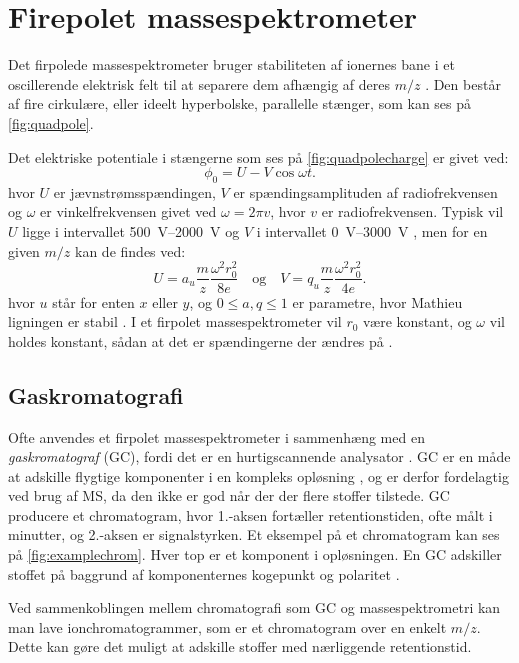 \section{Firepolet massespektrometer}
Det firpolede massespektrometer bruger stabiliteten af ionernes bane i et oscillerende elektrisk felt til at separere dem afhængig af deres $m/z$ \parencite{massspec}.
Den består af fire cirkulære, eller ideelt hyperbolske, parallelle stænger, som kan ses på \cref{fig:quadpole}.

Det elektriske potentiale i stængerne som ses på \cref{fig:quadpolecharge} er givet ved:
\begin{equation}
	\phi_0 = U - V \cos{\omega t}.
\end{equation}
hvor $U$ er jævnstrømsspændingen, $V$ er spændingsamplituden af radiofrekvensen og $\omega$ er vinkelfrekvensen givet ved $\omega = 2\pi v$, hvor $v$ er radiofrekvensen.
Typisk vil $U$ ligge i intervallet \qtyrange{500}{2000}{\volt} og $V$ i intervallet \qtyrange{0}{3000}{\volt} \parencite{massspec}, men for en given $m/z$ kan de findes ved:
\begin{equation}
	U = a_u \frac{m}{z} \frac{\omega^2 r_0^2}{8e}\quad\text{og}\quad V = q_u \frac{m}{z} \frac{\omega^2 r_0^2}{4e}.
\end{equation}
hvor $u$ står for enten $x$ eller $y$, og $0 \leq a, q \leq 1$ er parametre, hvor Mathieu ligningen er stabil \parencite{mathieu,massspec}.
I et firpolet massespektrometer vil $r_0$ være konstant, og $\omega$ vil holdes konstant, sådan at det er spændingerne der ændres på \parencite{mstextbook}.
\subsection{Gaskromatografi}
Ofte anvendes et firpolet massespektrometer i sammenhæng med en \emph{gaskromatograf} (GC), fordi det er en hurtigscannende analysator \parencite{basicgaschrom}.
GC er en måde at adskille flygtige komponenter i en kompleks opløsning \parencite{mstextbook}, og er derfor fordelagtig ved brug af MS, da den ikke er god når der der flere stoffer tilstede.
GC producere et chromatogram, hvor 1.-aksen fortæller retentionstiden, ofte målt i minutter, og 2.-aksen er signalstyrken.
Et eksempel på et chromatogram kan ses på \cref{fig:examplechrom}. Hver top er et komponent i opløsningen.
En GC adskiller stoffet på baggrund af komponenternes kogepunkt og polaritet \parencite{kromatografi}.

\par Ved sammenkoblingen mellem chromatografi som GC og massespektrometri kan man lave ionchromatogrammer, som er et chromatogram over en enkelt $m/z$.
Dette kan gøre det muligt at adskille stoffer med nærliggende retentionstid.
